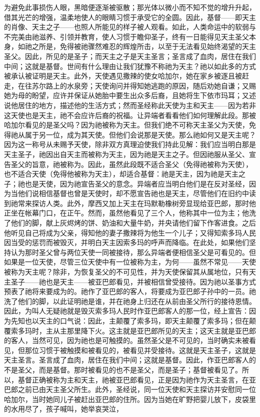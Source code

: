 为避免此事损伤人眼，黑暗便逐渐被驱散；那光体以微小而不知不觉的增升升起，借其光芒的增强，温柔地使人的眼睛习惯于承受它的全圆。因此，基督——即天主的肖像、天主之子——也照人所能见的样子被人观看。如此，人类命运中的软弱与不完美由祂滋养、引领并教育，使人习惯于瞻仰圣子，终有一日能得见天主圣父本身，如祂之所是，免得被祂骤然难忍的辉煌所击，以至于无法看见始终渴望的天主圣父。因此，所见的是圣子；而天主之子是天主圣言；圣言成了血肉，居住在我们中间；这就是基督。世间有什么理由让我们犹豫不称祂为天主？祂以如此多的方式被承认被证明是天主。此外，天使遇见撒辣的使女哈加尔，她在家乡被逐且被赶走，在往苏尔路上的水泉旁；天使询问并得知她逃跑的原因，随后劝她自谦；又赐她为母的盼望，应许并保证从她胎中要生出众多后裔，且她将生下依市玛耳；又述说他居住的地方，描述他的生活方式；然而圣经称此天使为主和天主——因为若非这天使也是天主，祂不会应许后裔的祝福。让异端者看看他们如何理解此段。那被哈加尔看见的是圣父吗？因为祂被称为天主。但我们绝不可称天主圣父为天使，免得祂从属于另一位，成为其天使。但他们会说那是天使。那么祂如何又是天主呢？因为这一称号从未赐予天使，除非双方真理迫使我们持此见解：我们应当明白那是天主圣子，祂因出自天主而被称为天主，因为祂是天主之子。但因祂服从圣父、宣告圣父的旨意，祂被称为。因此，虽然此段既不适合圣父（免得祂被称为天使），也不适合天使（免得他被称为天主），却适合基督：祂是天主，因为祂是天主之子；祂也是天使，因为祂宣告圣父的意念。异端者应当明白他们是在反对圣经，因为当他们说相信基督也曾是天使时，却不愿宣告祂也是天主，尽管他们在旧约中读到祂常来探访人类。此外，摩西又加上天主在玛默勒橡树旁显现给亚巴郎，那时他正坐在帐幕门口，在正午。然而，虽然他看见了三个人，他称其中一位为主；他洗了他们的脚，献上灰烬烤的饼、奶油和大量牛奶，并央请他们留下作客进食。之后他听见自己将成为父亲，得知他的妻子撒辣将为他生一个儿子；又得知索多玛人民因当受的惩罚而被毁灭，并明白天主因索多玛的呼声而降临。在此处，如果他们坚持认为那时圣父曾与两位天使一同被接待，那么异端者便相信圣父是可看见的。但如果是一位天使，尽管三位天使中有一位被称为主，为何——虽然不常见——天使被称为天主呢？除非，为恢复圣父的不可见性，并为天使保留其从属地位，只有天主圣子——祂也是天主——被亚巴郎看见，并被相信曾受接待。因为祂以圣事方式预表了祂将来要成为的。祂作了亚巴郎的客人，将要成为亚巴郎子孙中的一员。祂洗了他们的脚，以此证明祂是谁，并在祂身上归还在从前由圣父所行的接待恩情。因此，为叫人无疑祂就是毁灭索多玛人民时作亚巴郎客人的那一位，经上宣告：因为先知也以天主的口气说：因此，主颠覆了索多玛，即天主颠覆了索多玛；但在颠覆索多玛时，主从主那里降下火。这主就是亚巴郎所见的天主；这天主就是亚巴郎的客人，当然可见，因为祂也是可触摸的。虽然圣父是不可见的，当时确实未被看见，但那位习惯于被触摸和被看见的，被看见并受接待。这就是天主圣子，这就是天主圣言。圣言成了血肉，居住在我们中间；这就是基督。因此，作亚巴郎客人的不是圣父，而是基督。那时被看见的也不是圣父，而是圣子；基督被看见了。所以，基督正确被称为主和天主，祂被亚巴郎看见，正是因为祂作为天主圣言，在亚巴郎之前已由天主圣父所生。此外，圣经说，同一位天使和天主探访并安慰同一位哈加尔，当时她同儿子被赶出亚巴郎的住所。因为当她在旷野把婴儿放下，皮袋里的水用尽了，孩子喊叫，她举哀哭泣，\B